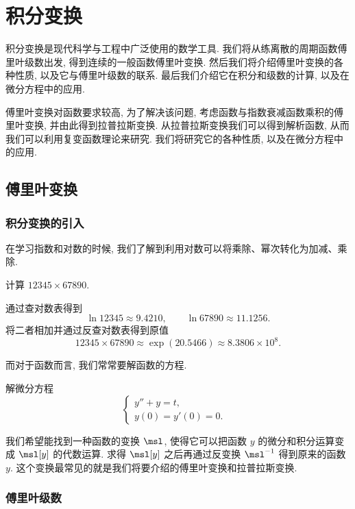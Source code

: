 \chapter{积分变换}
\label{chapter:7}

积分变换是现代科学与工程中广泛使用的数学工具.
我们将从练离散的周期函数傅里叶级数出发, 得到连续的一般函数傅里叶变换.
然后我们将介绍傅里叶变换的各种性质, 以及它与傅里叶级数的联系.
最后我们介绍它在积分和级数的计算, 以及在微分方程中的应用.

傅里叶变换对函数要求较高, 为了解决该问题, 考虑函数与指数衰减函数乘积的傅里叶变换, 并由此得到拉普拉斯变换.
从拉普拉斯变换我们可以得到解析函数, 从而我们可以利用复变函数理论来研究.
我们将研究它的各种性质, 以及在微分方程中的应用.

\section{傅里叶变换}

\subsection{积分变换的引入}

在学习指数和对数的时候, 我们了解到利用对数可以将乘除、幂次转化为加减、乘除.
\begin{example}
  计算 $12345\times 67890$.
\end{example}

\begin{solution}
  通过查对数表得到
  \[
    \ln 12345\approx 9.4210,\qquad\ln 67890\approx 11.1256.
  \]
  将二者相加并通过反查对数表得到原值
  \[
    12345\times 67890\approx \exp(20.5466)\approx 8.3806\times 10^8.
  \]
\end{solution}

而对于函数而言, 我们常常要解函数的方程.

\begin{example}
  解微分方程
  \[
    \begin{cases}
      y''+y=t,&\\
      y(0)=y'(0)=0.&
    \end{cases}
  \]
\end{example}

我们希望能找到一种函数的\alert{变换 $\msl$}, 使得它可以把函数 $y$ 的微分和积分运算变成 $\msl[y]$ 的代数运算.
求得 $\msl[y]$ 之后再通过\alert{反变换 $\msl^{-1}$} 得到原来的函数 $y$.
这个变换最常见的就是我们将要介绍的傅里叶变换和拉普拉斯变换.


\subsection{傅里叶级数}

